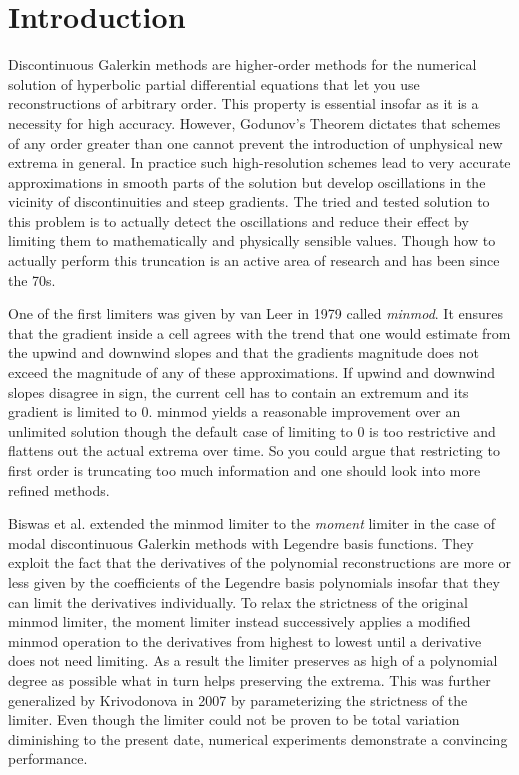 \section{Introduction}

Discontinuous Galerkin methods are higher-order methods for the numerical solution of hyperbolic partial differential equations that let you use reconstructions of arbitrary order.
This property is essential insofar as it is a necessity for high accuracy.
However, Godunov's Theorem dictates that schemes of any order greater than one cannot prevent the introduction of unphysical new extrema in general.
In practice such high-resolution schemes lead to very accurate approximations in smooth parts of the solution but develop oscillations in the vicinity of discontinuities and steep gradients.
The tried and tested solution to this problem is to actually detect the oscillations and reduce their effect by limiting them to mathematically and physically sensible values.
Though how to actually perform this truncation is an active area of research and has been since the 70s.

One of the first limiters was given by van Leer in 1979 called \emph{minmod}\cite{VanLeer1979}.
It ensures that the gradient inside a cell agrees with the trend that one would estimate from the upwind and downwind slopes and that the gradients magnitude does not exceed the magnitude of any of these approximations.
If upwind and downwind slopes disagree in sign, the current cell has to contain an extremum and its gradient is limited to $0$.
minmod yields a reasonable improvement over an unlimited solution though the default case of limiting to $0$ is too restrictive and flattens out the actual extrema over time.
So you could argue that restricting to first order is truncating too much information and one should look into more refined methods.

Biswas et al. extended the minmod limiter to the \emph{moment} limiter\cite{Biswas1994} in the case of modal discontinuous Galerkin methods with Legendre basis functions.
They exploit the fact that the derivatives of the polynomial reconstructions are more or less given by the coefficients of the Legendre basis polynomials insofar that they can limit the derivatives individually.
To relax the strictness of the original minmod limiter, the moment limiter instead successively applies a modified minmod operation to the derivatives from highest to lowest until a derivative does not need limiting.
As a result the limiter preserves as high of a polynomial degree as possible what in turn helps preserving the extrema.
This was further generalized by Krivodonova in 2007 by parameterizing the strictness of the limiter\cite{Krivodonova}.
Even though the limiter could not be proven to be total variation diminishing to the present date, numerical experiments demonstrate a convincing performance.


